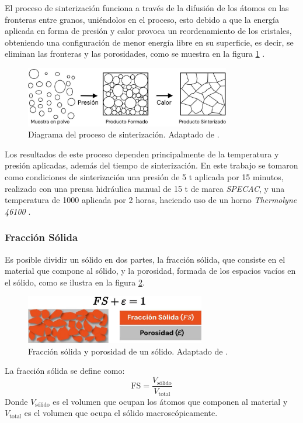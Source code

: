 \documentclass[../main.tex]{subfiles}
\begin{document}
El proceso de sinterización funciona a través de la difusión de los átomos en las fronteras entre granos, uniéndolos en el proceso, esto debido a que la energía aplicada en forma de presión y calor provoca un reordenamiento de los cristales, obteniendo una configuración de menor energía libre en su superficie, es decir, se eliminan las fronteras y las porosidades, como se muestra en la figura \ref{fig:sintdiag} \cite{Ou2014}.
\begin{figure}[H]
    \centering
    \includegraphics[width=0.8\textwidth]{fig/sintdiag.jpg}
    \caption{Diagrama del proceso de sinterización. Adaptado de \cite{Ou2014}.}
    \label{fig:sintdiag}
\end{figure}

Los resultados de este proceso dependen principalmente de la temperatura y presión aplicadas, además del tiempo de sinterización. En este trabajo se tomaron como condiciones de sinterización una presión de 5 t aplicada por 15 minutos, realizado con una prensa hidráulica manual de 15 t de marca \textit{SPECAC}, y una temperatura de 1000\gradoC{} aplicada por 2 horas, haciendo uso de un horno \textit{Thermolyne 46100} \cite{Aparnadevi2016}.

\subsubsection{Fracción Sólida}
Es posible dividir un sólido en dos partes, la fracción sólida, que consiste en el material que compone al sólido, y la porosidad, formada de los espacios vacíos en el sólido, como se ilustra en la figura \ref{fig:fracsolida}. 
\begin{figure}[H]
    \centering
    \includegraphics[width=0.7\textwidth]{fig/fracsolida.jpg}
    \caption{Fracción sólida y porosidad de un sólido. Adaptado de \cite{Erklaert2024}.}
    \label{fig:fracsolida}
\end{figure}
La fracción sólida se define como:
\begin{equation}
    \text{FS}=\dfrac{V_\text{sólido}}{V_\text{total}}
    \label{eq:fracsolida}
\end{equation}
Donde $V_\text{sólido}$ es el volumen que ocupan los átomos que componen al material y $V_\text{total}$ es el volumen que ocupa el sólido macroscópicamente.
\end{document}
